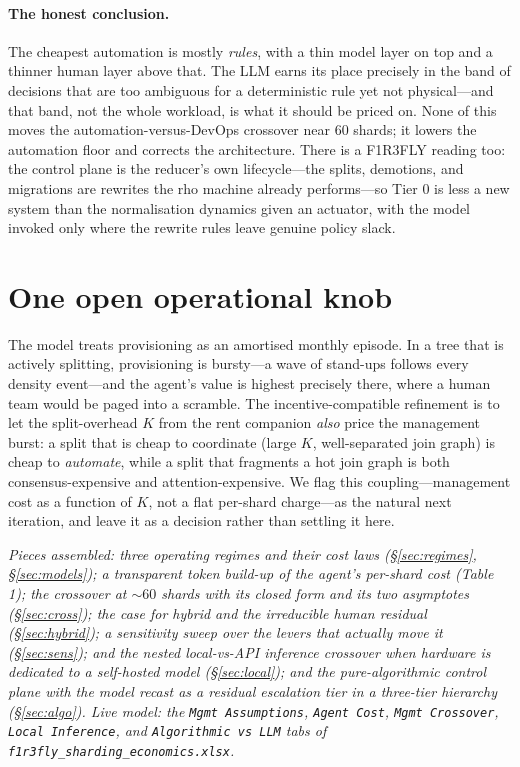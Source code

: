 \documentclass[11pt]{article}
\begin{document}
\paragraph{The honest conclusion.} The cheapest automation is mostly \emph{rules}, with a thin model
layer on top and a thinner human layer above that. The LLM earns its place precisely in the band of
decisions that are too ambiguous for a deterministic rule yet not physical---and that band, not the
whole workload, is what it should be priced on. None of this moves the automation-versus-DevOps
crossover near \num{60} shards; it lowers the automation floor and corrects the architecture. There
is a F1R3FLY reading too: the control plane is the reducer's own lifecycle---the splits, demotions,
and migrations are rewrites the rho machine already performs---so Tier 0 is less a new system than the
normalisation dynamics given an actuator, with the model invoked only where the rewrite rules leave
genuine policy slack.

\section{One open operational knob}

The model treats provisioning as an amortised monthly episode. In a tree that is actively splitting,
provisioning is bursty---a wave of stand-ups follows every density event---and the agent's value is
highest precisely there, where a human team would be paged into a scramble. The incentive-compatible
refinement is to let the split-overhead $K$ from the rent companion \emph{also} price the management
burst: a split that is cheap to coordinate (large $K$, well-separated join graph) is cheap to
\emph{automate}, while a split that fragments a hot join graph is both consensus-expensive and
attention-expensive. We flag this coupling---management cost as a function of $K$, not a flat
per-shard charge---as the natural next iteration, and leave it as a decision rather than settling it
here.

\bigskip
\noindent\textit{Pieces assembled: three operating regimes and their cost laws (\S\ref{sec:regimes},
\S\ref{sec:models}); a transparent token build-up of the agent's per-shard cost (Table 1); the
crossover at $\sim\!60$ shards with its closed form and its two asymptotes (\S\ref{sec:cross}); the
case for hybrid and the irreducible human residual (\S\ref{sec:hybrid}); a sensitivity sweep over
the levers that actually move it (\S\ref{sec:sens}); and the nested local-vs-API inference crossover
when hardware is dedicated to a self-hosted model (\S\ref{sec:local}); and the pure-algorithmic
control plane with the model recast as a residual escalation tier in a three-tier hierarchy
(\S\ref{sec:algo}). Live model: the
\texttt{Mgmt Assumptions},
\texttt{Agent Cost}, \texttt{Mgmt Crossover}, \texttt{Local Inference}, and
\texttt{Algorithmic vs LLM} tabs of \texttt{f1r3fly\_sharding\_economics.xlsx}.}
\end{document}
